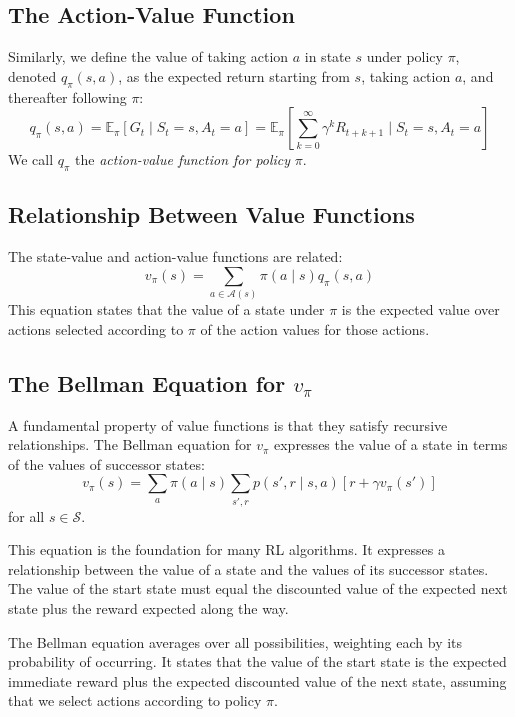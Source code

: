 \documentclass[12pt]{article}
\begin{document}
\subsection{The Action-Value Function}

Similarly, we define the value of taking action $a$ in state $s$ under policy $\pi$, denoted $q_\pi(s, a)$, as the expected return starting from $s$, taking action $a$, and thereafter following $\pi$:
\begin{equation}
q_\pi(s, a) = \mathbb{E}_\pi[G_t \mid S_t = s, A_t = a] = \mathbb{E}_\pi\left[\sum_{k=0}^{\infty} \gamma^k R_{t+k+1} \mid S_t = s, A_t = a\right]
\end{equation}
We call $q_\pi$ the \textit{action-value function for policy} $\pi$.

\subsection{Relationship Between Value Functions}

The state-value and action-value functions are related:
\begin{equation}
v_\pi(s) = \sum_{a \in \mathcal{A}(s)} \pi(a \mid s) q_\pi(s, a)
\end{equation}
This equation states that the value of a state under $\pi$ is the expected value over actions selected according to $\pi$ of the action values for those actions.

\subsection{The Bellman Equation for $v_\pi$}

A fundamental property of value functions is that they satisfy recursive relationships. The Bellman equation for $v_\pi$ expresses the value of a state in terms of the values of successor states:
\begin{equation}
v_\pi(s) = \sum_{a} \pi(a \mid s) \sum_{s', r} p(s', r \mid s, a)[r + \gamma v_\pi(s')]
\end{equation}
for all $s \in \mathcal{S}$.

This equation is the foundation for many RL algorithms. It expresses a relationship between the value of a state and the values of its successor states. The value of the start state must equal the discounted value of the expected next state plus the reward expected along the way.

The Bellman equation averages over all possibilities, weighting each by its probability of occurring. It states that the value of the start state is the expected immediate reward plus the expected discounted value of the next state, assuming that we select actions according to policy $\pi$.
\end{document}
